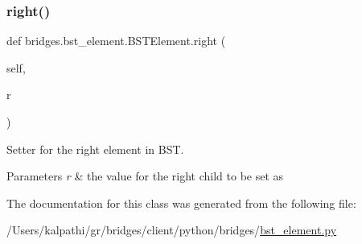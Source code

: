\subsubsection{\texorpdfstring{right()}{right()}\hspace{0.1cm}{\footnotesize\ttfamily [2/2]}}
{\footnotesize\ttfamily def bridges.\+bst\+\_\+element.\+B\+S\+T\+Element.\+right (\begin{DoxyParamCaption}\item[{}]{self,  }\item[{}]{r }\end{DoxyParamCaption})}



Setter for the right element in B\+ST. 


\begin{DoxyParams}{Parameters}
{\em r} & the value for the right child to be set as \\
\hline
\end{DoxyParams}


The documentation for this class was generated from the following file\+:\begin{DoxyCompactItemize}
\item 
/\+Users/kalpathi/gr/bridges/client/python/bridges/\mbox{\hyperlink{bst__element_8py}{bst\+\_\+element.\+py}}\end{DoxyCompactItemize}

